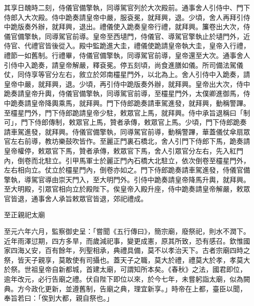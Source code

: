 \begin{pinyinscope}
 其享日醜時二刻，侍儀官備擎執，同導駕官列於大次殿前。通事舍人引侍中、門下侍郎入大次殿。侍中跪奏請皇帝中嚴，服袞冕，就拜興，退。少頃，舍人再拜引侍中跪版奏外辦，就拜興，退出。禮儀使入跪奏皇帝行禮，就拜興。簾卷出大次，侍儀官備擎執，同導駕官前導。皇帝至西壝門，侍儀官、導駕官擎執止於壝門外，近侍官、代禮官皆後從入。殿中監跪進大圭，禮儀使跪請皇帝執大圭，皇帝入行禮，禮節一如舊制。行禮畢，侍儀官備擎執，同導駕官前導，皇帝還至大次。通事舍人引侍中入跪奏，請皇帝解嚴，釋袞冕。停五刻頃，尚食進膳如儀。所司備法駕儀仗，同侍享等官分左右，敘立於郊南欞星門外，以北為上。舍人引侍中入跪奏，請皇帝中嚴，就拜興，退。少頃，再引侍中跪版奏外辦，就拜興。皇帝出大次，侍中跪奏請皇帝升輿，侍儀官備擎執，同導駕官前導，至欞星門外，太僕卿進御馬，侍中跪奏請皇帝降輿乘馬，就拜興。門下侍郎跪奏請車駕進發，就拜興，動稱警蹕。至欞星門外，門下侍郎跪請皇帝少駐，敕眾官上馬，就拜興。侍中承旨退稱曰「制可」，門下侍郎傳制，敕眾官上馬，贊者承傳，敕眾官上馬。少頃，門下侍郎跪奏請車駕進發，就拜興。侍儀官備擎執，同導駕官前導，動稱警蹕，華蓋儀仗傘扇眾官左右前導，教坊樂鼓吹皆作。至麗正門裏石橋北，舍人引門下侍郎下馬，跪奏請皇帝權停，敕眾官下馬，贊者承傳，敕眾官下馬，舍人引眾官分左右，先入紅門內，倒卷而北駐立。引甲馬軍士於麗正門內石橋大北駐立，依次倒卷至欞星門外，左右相向立。仗立於欞星門內，倒卷亦如之。門下侍郎跪奏請車駕進發，侍儀官備擎執，導駕官導由崇天門入，至大明門外。引侍中跪奏請皇帝降馬升輿，就拜興。至大明殿，引眾官相向立於殿陛下。俟皇帝入殿升座，侍中跪奏請皇帝解嚴，敕眾官皆退，通事舍人承旨敕眾官皆退，郊祀禮成。



 至正親祀太廟



 至元六年六月，監察御史呈：「嘗聞《五行傳曰》，簡宗廟，廢祭祀，則水不潤下。近年雨澤愆期，四方多旱，而歲減祀事，變更成憲，原其所致，恐有感召。欽惟國家四海乂安，百有餘年，列聖相承，典禮具備，莫不以孝治天下。古者宗廟四時之祭，皆天子親享，莫敢使有司攝也。蓋天子之職，莫大於禮，禮莫大於孝，孝莫大於祭。世祖皇帝自新都城，首建太廟，可謂知所本矣。《春秋》之法，國君即位，逾年改元，必行告廟之禮。伏自陛下即位以來，於今七年，未嘗躬詣太廟，似為闕典。方今政化更新，並遵舊制，告廟之典，理宜新享。」時帝在上都，臺臣以聞，奉旨若曰：「俟到大都，親自祭也。」




\end{pinyinscope}

